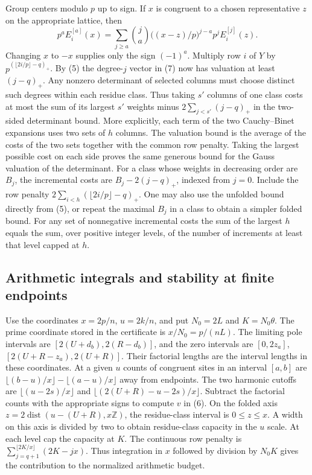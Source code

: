 \IfFileExists{TS1cmr.fd}{\documentclass[11pt]{article}}
\newcommand{\Z}{\mathbb Z}
\begin{document}
Group centers modulo \(p\) up to sign. If \(x\) is congruent to
a chosen representative \(z\) on the appropriate lattice, then
\[
 p^a E_i^{[a]}(x)=\sum_{j\ge a}\binom ja
       \bigl((x-z)/p\bigr)^{j-a}p^jE_i^{[j]}(z).
 \tag{7}
\]
Changing \(x\) to \(-x\) supplies only the sign \((-1)^a\).
Multiply row \(i\) of \(Y\) by
\(p^{(\lfloor2i/p\rfloor-q)_+}\). By (5) the degree-\(j\)
vector in (7) now has valuation at least \((j-q)_+\).
Any nonzero determinant of selected columns must choose
distinct such degrees within each residue class. Thus taking
\(s'\) columns of one class costs at most the sum of its
largest \(s'\) weights minus \(2\sum_{j<s'}(j-q)_+\) in the
two-sided determinant bound. More explicitly, each term of
the two Cauchy--Binet expansions uses two sets of \(h\)
columns. The valuation bound is the average of the costs of
the two sets together with the common row penalty. Taking the
largest possible cost on each side proves the same generous
bound for the Gauss valuation of the determinant.
For a class whose weights in decreasing order are \(B_j\),
the incremental costs are
\(B_j-2(j-q)_+\), indexed from \(j=0\).
Include the row penalty \(2\sum_{i<h}(\lfloor2i/p\rfloor-q)_+\).
One may also use the unfolded bound directly from (5), or
repeat the maximal \(B_j\) in a class to obtain a simpler folded
bound. For any set of nonnegative incremental costs the sum of
the largest \(h\) equals the sum, over positive integer levels,
of the number of increments at least that level capped at \(h\).

\subsection{Arithmetic integrals and stability at finite endpoints}
Use the coordinates \(x=2p/n\), \(u=2k/n\), and put \(N_0=2L\)
and \(K=N_0\theta\). The prime coordinate stored in the
certificate is \(x/N_0=p/(nL)\).
The limiting pole intervals are
\([2(U+d_b),2(R-d_b)]\), and the zero intervals are
\([0,2z_a]\), \([2(U+R-z_a),2(U+R)]\).
Their factorial lengths are the interval lengths in these
coordinates. At a given \(u\) counts of congruent sites in an
interval \([a,b]\) are
\(\lfloor(b-u)/x\rfloor-\lfloor(a-u)/x\rfloor\) away from
endpoints. The two harmonic cutoffs are
\(\lfloor(u-2s)/x\rfloor\) and
\(\lfloor(2(U+R)-u-2s)/x\rfloor\).
Subtract the factorial counts with the appropriate signs to
compute \(v\) in (6). On the folded axis
\(z=2\operatorname{dist}(u-(U+R),x\Z)\), the residue-class
interval is \(0\le z\le x\). A width on this axis is divided
by two to obtain residue-class capacity in the \(u\) scale.
At each level cap the capacity at \(K\). The continuous row
penalty is \(\sum_{j=q+1}^{\lfloor 2K/x\rfloor}(2K-jx)\).
Thus integration in \(x\) followed by division by \(N_0K\)
gives the contribution to the normalized arithmetic budget.
\end{document}
